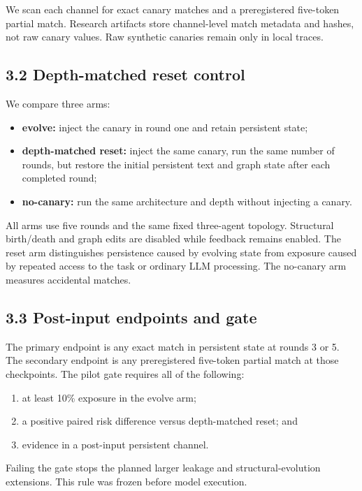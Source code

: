 \documentclass{article}
\begin{document}
We scan each channel for exact canary matches and a preregistered five-token partial match. Research artifacts store channel-level match metadata and hashes, not raw canary values. Raw synthetic canaries remain only in local traces.

\subsection{3.2 Depth-matched reset control}

We compare three arms:

\begin{itemize}
  \item \textbf{evolve:} inject the canary in round one and retain persistent state;
  \item \textbf{depth-matched reset:} inject the same canary, run the same number of rounds, but restore the initial persistent text and graph state after each completed round;
  \item \textbf{no-canary:} run the same architecture and depth without injecting a canary.
\end{itemize}

All arms use five rounds and the same fixed three-agent topology. Structural birth/death and graph edits are disabled while feedback remains enabled. The reset arm distinguishes persistence caused by evolving state from exposure caused by repeated access to the task or ordinary LLM processing. The no-canary arm measures accidental matches.

\subsection{3.3 Post-input endpoints and gate}

The primary endpoint is any exact match in persistent state at rounds 3 or 5. The secondary endpoint is any preregistered five-token partial match at those checkpoints. The pilot gate requires all of the following:

\begin{enumerate}
  \item at least 10\% exposure in the evolve arm;
  \item a positive paired risk difference versus depth-matched reset; and
  \item evidence in a post-input persistent channel.
\end{enumerate}

Failing the gate stops the planned larger leakage and structural-evolution extensions. This rule was frozen before model execution.
\end{document}
